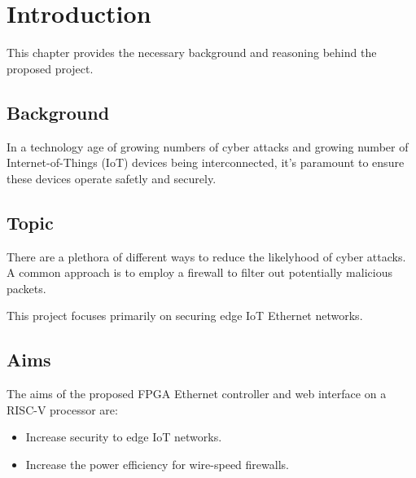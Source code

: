 \chapter[Introduction]{Introduction}
\label{Chap:Intro}




This chapter provides the necessary background and reasoning behind the proposed project. 

\section{Background }
In a technology age of growing numbers of cyber attacks and growing number of Internet-of-Things (IoT) devices being interconnected, it's 
paramount to ensure these devices operate safetly and securely. 

\section{Topic}


There are a plethora of different ways to reduce the likelyhood of cyber attacks.
A common approach is to employ a firewall to filter out potentially malicious packets. 

This project focuses primarily on securing edge IoT Ethernet networks. 


\section{Aims}

The aims of the proposed FPGA Ethernet controller and web interface on a RISC-V processor are:

\begin{itemize}
    \item Increase security to edge IoT networks.
    \item Increase the power efficiency for wire-speed firewalls.
\end{itemize}


